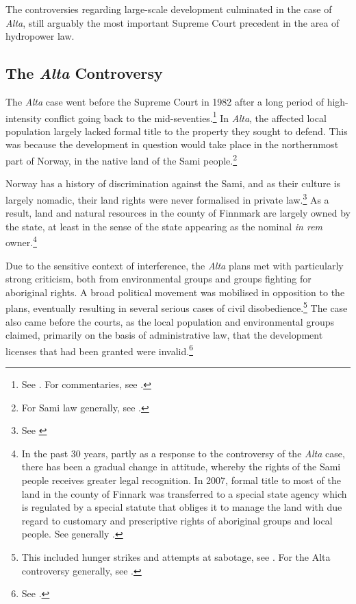 The controversies regarding large-scale development culminated in the case of {\it Alta}, still arguably the most important Supreme Court precedent in the area of hydropower law.

\subsection{The {\it Alta} Controversy}\label{sec:alta}

The {\it Alta} case went before the Supreme Court in 1982 after a long period of high-intensity conflict going back to the mid-seventies.\footnote{See \cite{alta82}. For commentaries, see \cite{eckhoff82,boe83,hagvar88}.} In {\it Alta}, the affected local population largely lacked formal title to the property they sought to defend. This was because the development in question would take place in the northernmost part of Norway, in the native land of the Sami people.\footnote{For Sami law generally, see \cite{skogvang02}.}

Norway has a history of discrimination against the Sami, and as their culture is largely nomadic, their land rights were never formalised in private law.\footnote{See \cite[149-156]{ravna12s}} As a result, land and natural resources in the county of Finnmark are largely owned by the state, at least in the sense of the state appearing as the nominal {\it in rem} owner.\footnote{In the past 30 years, partly as a response to the controversy of the {\it Alta} case, there has been a gradual change in attitude, whereby the rights of the Sami people receives greater legal recognition. In 2007, formal title to most of the land in the county of Finnark was transferred to a special state agency which is regulated by a special statute that obliges it to manage the land with due regard to customary and prescriptive rights of aboriginal groups and local people. See generally \cite{bull07}.}

Due to the sensitive context of interference, the {\it Alta} plans met with particularly strong criticism, both from environmental groups and groups fighting for aboriginal rights. A broad political movement was mobilised in opposition to the plans, eventually resulting in several serious cases of civil disobedience.\footnote{This included hunger strikes and attempts at sabotage, see \cite[80-83]{nilsen08}. For the Alta controversy generally, see \cite{altawiki,hjorthol06}.} The case also came before the courts, as the local population and environmental groups claimed, primarily on the basis of administrative law, that the development licenses that had been granted were invalid.\footnote{See \cite{eckhoff82}.}

